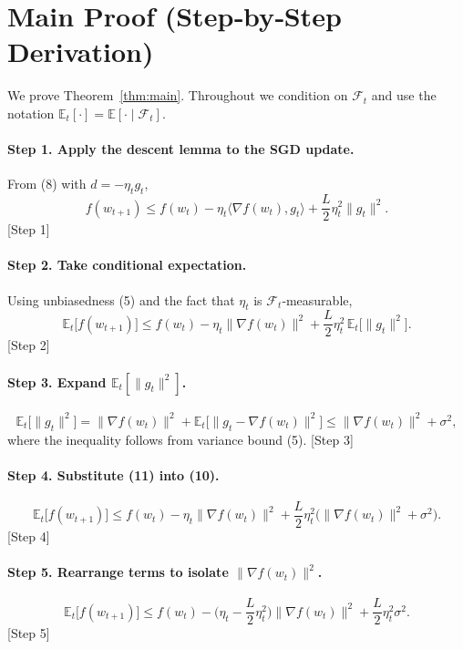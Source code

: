 \documentclass{article}
\begin{document}
\section*{Main Proof (Step‑by‑Step Derivation)}
We prove Theorem~\ref{thm:main}. Throughout we condition on $\mathcal{F}_t$ and use the notation
$\mathbb{E}_t[\cdot]=\mathbb{E}[\cdot\mid\mathcal{F}_t]$.

\paragraph{Step 1. Apply the descent lemma to the SGD update.}
From (8) with $d=-\eta_t g_t$,
\[
f(w_{t+1})\le f(w_t)-\eta_t\langle\nabla f(w_t),g_t\rangle
+\frac{L}{2}\eta_t^{2}\|g_t\|^{2}.
\tag{9}
\]
[Step 1]

\paragraph{Step 2. Take conditional expectation.}
Using unbiasedness (5) and the fact that $\eta_t$ is $\mathcal{F}_t$‑measurable,
\[
\mathbb{E}_t\!\big[f(w_{t+1})\big]
\le f(w_t)-\eta_t\|\nabla f(w_t)\|^{2}
+\frac{L}{2}\eta_t^{2}\,\mathbb{E}_t\!\big[\|g_t\|^{2}\big].
\tag{10}
\]
[Step 2]

\paragraph{Step 3. Expand $\mathbb{E}_t[\|g_t\|^{2}]$.}
\[
\mathbb{E}_t\!\big[\|g_t\|^{2}\big]
= \|\nabla f(w_t)\|^{2}
   +\mathbb{E}_t\!\big[\|g_t-\nabla f(w_t)\|^{2}\big]
\le \|\nabla f(w_t)\|^{2}+\sigma^{2},
\tag{11}
\]
where the inequality follows from variance bound (5).  
[Step 3]

\paragraph{Step 4. Substitute (11) into (10).}
\[
\mathbb{E}_t\!\big[f(w_{t+1})\big]
\le f(w_t)-\eta_t\|\nabla f(w_t)\|^{2}
+\frac{L}{2}\eta_t^{2}\Big(\|\nabla f(w_t)\|^{2}+\sigma^{2}\Big).
\tag{12}
\]
[Step 4]

\paragraph{Step 5. Rearrange terms to isolate $\|\nabla f(w_t)\|^{2}$.}
\[
\mathbb{E}_t\!\big[f(w_{t+1})\big]
\le f(w_t)-\Big(\eta_t-\frac{L}{2}\eta_t^{2}\Big)\|\nabla f(w_t)\|^{2}
+\frac{L}{2}\eta_t^{2}\sigma^{2}.
\tag{13}
\]
[Step 5]
\end{document}
